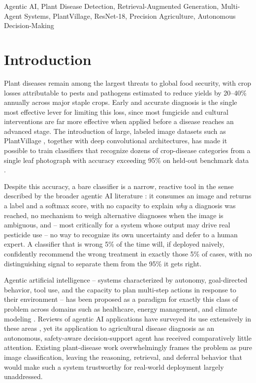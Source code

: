 \documentclass[conference]{IEEEtran}
\begin{document}
\begin{IEEEkeywords}
Agentic AI, Plant Disease Detection, Retrieval-Augmented Generation, Multi-Agent Systems, PlantVillage, ResNet-18, Precision Agriculture, Autonomous Decision-Making
\end{IEEEkeywords}

\section{Introduction}
\label{sec:intro}

Plant diseases remain among the largest threats to global food security, with crop losses attributable to pests and pathogens estimated to reduce yields by 20--40\% annually across major staple crops. Early and accurate diagnosis is the single most effective lever for limiting this loss, since most fungicide and cultural interventions are far more effective when applied before a disease reaches an advanced stage. The introduction of large, labeled image datasets such as PlantVillage \cite{r_hughes2015}, together with deep convolutional architectures, has made it possible to train classifiers that recognize dozens of crop-disease categories from a single leaf photograph with accuracy exceeding 95\% on held-out benchmark data \cite{r_mohanty2016}.

Despite this accuracy, a bare classifier is a narrow, reactive tool in the sense described by the broader agentic AI literature \cite{b1,b9}: it consumes an image and returns a label and a softmax score, with no capacity to explain \emph{why} a diagnosis was reached, no mechanism to weigh alternative diagnoses when the image is ambiguous, and -- most critically for a system whose output may drive real pesticide use -- no way to recognize its own uncertainty and defer to a human expert. A classifier that is wrong 5\% of the time will, if deployed naively, confidently recommend the wrong treatment in exactly those 5\% of cases, with no distinguishing signal to separate them from the 95\% it gets right.

Agentic artificial intelligence -- systems characterized by autonomy, goal-directed behavior, tool use, and the capacity to plan multi-step actions in response to their environment -- has been proposed as a paradigm for exactly this class of problem across domains such as healthcare, energy management, and climate modeling \cite{b1,b3,b6,b13,b14}. Reviews of agentic AI applications have surveyed its use extensively in these areas \cite{b2,b5,b10}, yet its application to agricultural disease diagnosis as an autonomous, safety-aware decision-support agent has received comparatively little attention. Existing plant-disease work overwhelmingly frames the problem as pure image classification, leaving the reasoning, retrieval, and deferral behavior that would make such a system trustworthy for real-world deployment largely unaddressed.
\end{document}
